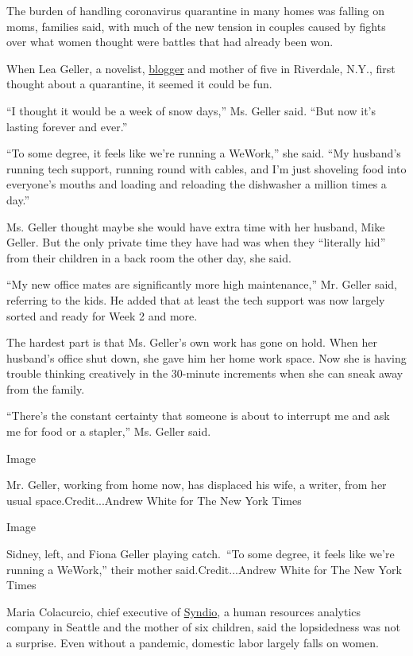 The burden of handling coronavirus quarantine in many homes was falling
on moms, families said, with much of the new tension in couples caused
by fights over what women thought were battles that had already been
won.

When Lea Geller, a novelist,
\href{https://thisisthecornerwepeein.wordpress.com/}{blogger} and mother
of five in Riverdale, N.Y., first thought about a quarantine, it seemed
it could be fun.

``I thought it would be a week of snow days,'' Ms. Geller said. ``But
now it's lasting forever and ever.''

``To some degree, it feels like we're running a WeWork,'' she said. ``My
husband's running tech support, running round with cables, and I'm just
shoveling food into everyone's mouths and loading and reloading the
dishwasher a million times a day.''

Ms. Geller thought maybe she would have extra time with her husband,
Mike Geller. But the only private time they have had was when they
``literally hid'' from their children in a back room the other day, she
said.

``My new office mates are significantly more high maintenance,'' Mr.
Geller said, referring to the kids. He added that at least the tech
support was now largely sorted and ready for Week 2 and more.

The hardest part is that Ms. Geller's own work has gone on hold. When
her husband's office shut down, she gave him her home work space. Now
she is having trouble thinking creatively in the 30-minute increments
when she can sneak away from the family.

``There's the constant certainty that someone is about to interrupt me
and ask me for food or a stapler,'' Ms. Geller said.

Image

Mr. Geller, working from home now, has displaced his wife, a writer,
from her usual space.Credit...Andrew White for The New York Times

Image

Sidney, left, and Fiona Geller playing catch.~``To some degree, it feels
like we're running a WeWork,'' their mother said.Credit...Andrew White
for The New York Times

Maria Colacurcio, chief executive of \href{https://synd.io/}{Syndio}, a
human resources analytics company in Seattle and the mother of six
children, said the lopsidedness was not a surprise. Even without a
pandemic, domestic labor largely falls on women.

